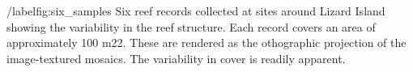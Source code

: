 /label{fig:six_samples} Six reef records collected at sites around Lizard Island showing the variability in the reef structure. Each record covers an area of approximately 100 m22. These are rendered as the othographic projection of the image-textured mosaics. The variability in cover is readily apparent.